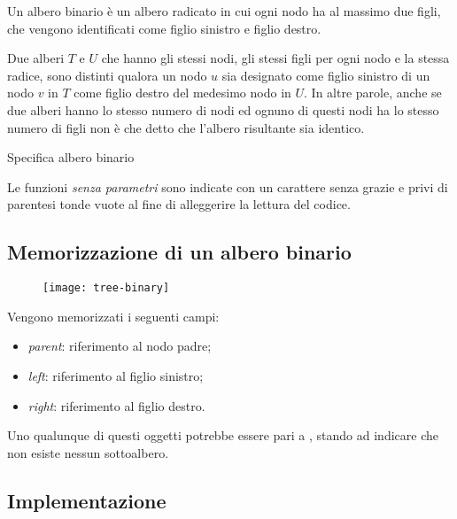 \begin{definition}
Un albero binario è un albero radicato in cui ogni nodo ha al massimo due figli, che vengono identificati come figlio sinistro e figlio destro.
\end{definition}

\begin{note}
Due alberi \(T\) e \(U\) che hanno gli stessi nodi, gli stessi figli per ogni nodo e la stessa radice, sono distinti qualora un nodo \(u\) sia designato come figlio sinistro di un nodo \(v\) in \(T\) come figlio destro del medesimo nodo in \(U\).
In altre parole, anche se due alberi hanno lo stesso numero di nodi ed ognuno di questi nodi ha lo stesso numero di figli non è che detto che l'albero risultante sia identico.
\end{note}

\begin{algorithm}[H]
	\caption{Specifica albero binario}
	
\end{algorithm}

\begin{note}
Le funzioni \emph{senza parametri} sono indicate con un carattere senza grazie e privi di parentesi tonde vuote al fine di alleggerire la lettura del codice.
\end{note}

\subsection{Memorizzazione di un albero binario}

\begin{figure}[H]
	\centering
	\texttt{[image: tree-binary]}
\end{figure}

Vengono memorizzati i seguenti campi:
\begin{itemize}
	\item \emph{parent}: riferimento al nodo padre;
	\item \emph{left}: riferimento al figlio sinistro;
	\item \emph{right}: riferimento al figlio destro.
\end{itemize}
Uno qualunque di questi oggetti potrebbe essere pari a \Nil, stando ad indicare che non esiste nessun sottoalbero.

\subsection{Implementazione}

